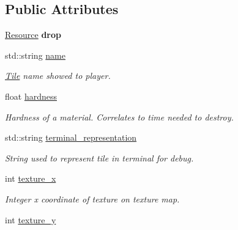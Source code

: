 \subsection*{Public Attributes}
\begin{DoxyCompactItemize}
\item 
\hypertarget{classTile_aeaeeec2011bc127120fdd3447d623235}{\hyperlink{structResource}{Resource} {\bfseries drop}}\label{classTile_aeaeeec2011bc127120fdd3447d623235}

\item 
\hypertarget{classTile_aa5408d0f0f4a60f25796f651db2f84ac}{std\-::string \hyperlink{classTile_aa5408d0f0f4a60f25796f651db2f84ac}{name}}\label{classTile_aa5408d0f0f4a60f25796f651db2f84ac}

\begin{DoxyCompactList}\small\item\em \hyperlink{classTile}{Tile} name showed to player. \end{DoxyCompactList}\item 
\hypertarget{classTile_accd68364f51cf745c5c95717a164b2e9}{float \hyperlink{classTile_accd68364f51cf745c5c95717a164b2e9}{hardness}}\label{classTile_accd68364f51cf745c5c95717a164b2e9}

\begin{DoxyCompactList}\small\item\em Hardness of a material. Correlates to time needed to destroy. \end{DoxyCompactList}\item 
\hypertarget{classTile_a4792f343c63f2b7c1bf1a7321ba60206}{std\-::string \hyperlink{classTile_a4792f343c63f2b7c1bf1a7321ba60206}{terminal\-\_\-representation}}\label{classTile_a4792f343c63f2b7c1bf1a7321ba60206}

\begin{DoxyCompactList}\small\item\em String used to represent tile in terminal for debug. \end{DoxyCompactList}\item 
\hypertarget{classTile_ac1b8010b027d438ee826af235dc00fe1}{int \hyperlink{classTile_ac1b8010b027d438ee826af235dc00fe1}{texture\-\_\-x}}\label{classTile_ac1b8010b027d438ee826af235dc00fe1}

\begin{DoxyCompactList}\small\item\em Integer x coordinate of texture on texture map. \end{DoxyCompactList}\item 
\hypertarget{classTile_addde9f80a365eae65b1f4bc156f18722}{int \hyperlink{classTile_addde9f80a365eae65b1f4bc156f18722}{texture\-\_\-y}}\label{classTile_addde9f80a365eae65b1f4bc156f18722}


\end{DoxyCompactItemize}

